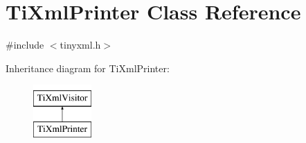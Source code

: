 \hypertarget{classTiXmlPrinter}{\section{\-Ti\-Xml\-Printer \-Class \-Reference}
\label{classTiXmlPrinter}
}


{\ttfamily \#include $<$tinyxml.\-h$>$}

\-Inheritance diagram for \-Ti\-Xml\-Printer\-:\begin{figure}[H]
\begin{center}
\leavevmode
\includegraphics[height=2.000000cm]{classTiXmlPrinter}
\end{center}
\end{figure}
